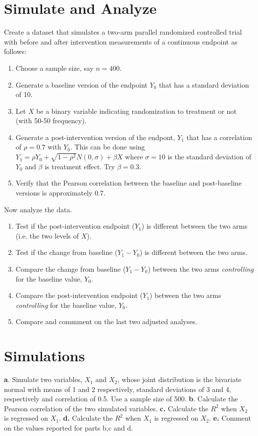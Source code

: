 \documentclass[11pt]{article}
\newenvironment{enum1}
{\begin{enumerate}
  \setlength{\itemsep}{1pt}
  \setlength{\parskip}{0pt}
  \setlength{\parsep}{0pt}
}{\end{enumerate}}
\begin{document}
\section{Simulate and Analyze}

Create a dataset that simulates a two-arm parallel randomized controlled trial with before and after intervention measurements of a continuous endpoint as follows: 
\begin{enum1}
\item Choose a sample size, say $n=400$. 
\item Generate a baseline version of the endpoint $Y_0$ that has a standard deviation of 10.
\item Let $X$ be a binary variable indicating randomization to treatment or not (with 50-50 frequency). 
\item Generate a post-intervention version of the endpont, $Y_1$ that has a correlation of $\rho=0.7$ with $Y_0$. This can be done using $Y_1=\rho Y_0+\sqrt{1-\rho^2}N(0,\sigma)+\beta X$ where $\sigma=10$ is the standard deviation of $Y_0$ and $\beta$ is treatment effect. Try $\beta=0.3$.
\item Verify that the Pearson correlation between the baseline and post-baseline versions is approximately 0.7.
\end{enum1}

Now analyze the data.

\begin{enum1}
\item Test if the post-intervention endpoint  ($Y_1$) is different between the two arms (i.e. the two levels of $X$).
\item Test if the change from baseline ($Y_1-Y_0$) is different between the two arms.
\item Compare the change from baseline ($Y_1-Y_0$) between the two arms {\it controlling} for the baseline value, $Y_0$.
\item Compare the post-intervention endpoint ($Y_1$)  between the two arms {\it controlling} for the baseline value, $Y_0$.
\item Compare and commment on the last two adjusted analyses.
\end{enum1}


\section{Simulations}

 {\bf a}. Simulate two variables, $X_1$ and $X_2$, whose joint distribution is the bivariate normal with means of 1 and 2 respectively, standard deviations of 3 and 4, respectively and correlation of 0.5. Use a sample size of 500. {\bf b}. Calculate the Pearson correlation of the two simulated variables. {\bf c.} Calculate the $R^2$ when $X_2$ is regressed on $X_1$. {\bf d.} Calculate the $R^2$ when $X_1$ is regressed on $X_2$. {\bf e.} Comment on the values reported for parts b,c and d. 
\end{document}
